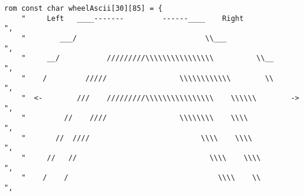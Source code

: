 \begin{lstlisting}
rom const char wheelAscii[30][85] = {
	"     Left   ____-------         ------____    Right                                 ",
	"        ___/                              \\___                                      ",
	"     __/           /////////\\\\\\\\\\\\\\\\          \\__                                   ",
	"    /         /////                 \\\\\\\\\\\\        \\                                 ",
	"  <-        ///    /////////\\\\\\\\\\\\\\\\    \\\\\\        ->                               ",
	"         //    ////                 \\\\\\\\    \\\\                                      ",
	"       //  ////                          \\\\    \\\\                                   ",
	"     //   //                               \\\\    \\\\                                 ",
	"    /    /                                   \\\\    \\                                ",

\end{lstlisting}
